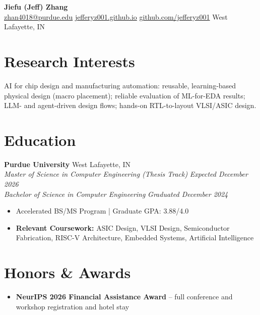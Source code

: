 \documentclass[11pt, letterpaper]{article}
\begin{document}
\begin{center}
    {\Huge \textbf{Jiefu (Jeff) Zhang}} \\[5pt]
    \href{mailto:zhan4018@purdue.edu}{zhan4018@purdue.edu} \quad\textbar\quad
    \href{https://jefferyz001.github.io}{jefferyz001.github.io} \quad\textbar\quad
    \href{https://github.com/jefferyz001}{github.com/jefferyz001} \quad\textbar\quad
    West Lafayette, IN
\end{center}

\section{Research Interests}
AI for chip design and manufacturing automation: reusable, learning-based physical design (macro placement); reliable evaluation of ML-for-EDA results; LLM- and agent-driven design flows; hands-on RTL-to-layout VLSI/ASIC design.

\section{Education}
\textbf{Purdue University} \hfill West Lafayette, IN \\
\textit{Master of Science in Computer Engineering (Thesis Track)} \hfill \textit{Expected December 2026} \\
\textit{Bachelor of Science in Computer Engineering} \hfill \textit{Graduated December 2024}
\begin{itemize}
    \item Accelerated BS/MS Program \quad | \quad Graduate GPA: 3.88/4.0
    \item \textbf{Relevant Coursework:} ASIC Design, VLSI Design, Semiconductor Fabrication, RISC-V Architecture, Embedded Systems, Artificial Intelligence
\end{itemize}

\section{Honors \& Awards}
\begin{itemize}
    \item \textbf{NeurIPS 2026 Financial Assistance Award} -- full conference and workshop registration and hotel stay
\end{itemize}
\end{document}
